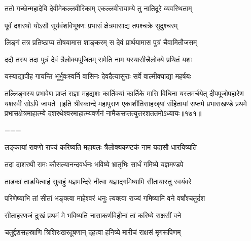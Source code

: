 
\twolineshloka
{ततो गच्छेन्महादेवि देवीमेकल्लवीरिकाम्}
{एकल्लवीरायाम्ये तु नातिदूरे व्यवस्थिताम्}%

\twolineshloka
{पूर्वं दशरथो योऽसौ सूर्यवंशविभूषणः}
{प्रभासं क्षेत्रमासाद्य तपश्चक्रे सुदुश्चरम्}%

\twolineshloka
{लिङ्गं तत्र प्रतिष्ठाप्य तोषयामास शाङ्करम्}
{स देवं प्रार्थयामास पुत्रं चैवामितौजसम्}%

\twolineshloka
{ददौ तस्य तदा पुत्रं देवं त्रैलोक्यपूजितम्}
{रामेति नाम यस्यासीत्त्रैलोक्ये प्रथितं यशः}%

\twolineshloka
{यस्याद्यापीह गायन्ति भूर्भुवःस्वर्नि वासिनः}
{देवदैत्यासुराः सर्वे वाल्मीक्याद्या महर्षयः}%

\threelineshloka
{तल्लिङ्गस्य प्रभावेण प्राप्तं राज्ञा महद्यशः}
{कार्तिक्यां कार्तिके मासि विधिना यस्तमर्चयेत्}
{दीपपूजोपहारेण यशस्वी सोऽपि जायते}%
॥इति श्रीस्कान्दे महापुराण एकाशीतिसाहस्र्यां संहितायां सप्तमे प्रभासखण्डे प्रथमे प्रभासक्षेत्रमाहात्म्ये दशरथेश्वरमाहात्म्यवर्णनं नामैकसप्तत्युत्तरशततमोऽध्यायः॥१७१॥

===


\tags{}
\notes{}

\storymeta

\twolineshloka
{लङ्कायां रावणो राज्यं करिष्यति महाबलः}
{त्रैलोक्यकण्टकं नाम यदासौ धारयिष्यति}%

\twolineshloka
{तदा दाशरथी रामः कौसल्यानन्दवर्धनः}
{भविष्ये भ्रातृभिः सार्धं गमिष्ये यज्ञमण्डपे}%

\twolineshloka
{ताडकां ताडयित्वाहं सुबाहुं यज्ञमन्दिरे}
{नीत्वा यज्ञाद्गमिष्यामि सीतायास्तु स्वयंवरे}%

\twolineshloka
{परिणेष्याभि तां सीतां भङ्क्त्वा माहेश्वरं धनुः}
{त्यक्त्वा राज्यं गमिष्यामि वने वर्षांश्चतुर्दश}%

\twolineshloka
{सीताहरणजं दुःखं प्रथमं मे भविष्यति}
{नासाकर्णविहीनां तां करिष्ये राक्षसीं वने}%

\twolineshloka
{चतुर्द्दशसहस्राणि त्रिशिरःखरदूषणान्}
{द्हत्वा हनिष्ये मारीचं राक्षसं मृगरूपिणम्}%


